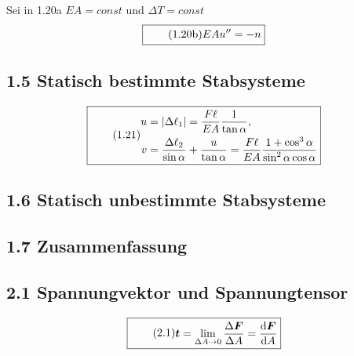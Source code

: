 \documentclass[11pt]{article}
\newcommand{\1}{ {\mathds{1}} }
\newcommand{\abs}[1]{\lvert#1\rvert}
\begin{document}
    Sei in 1.20a $EA = const$ und $\Delta T = const$
    \begin{equation}
      \boxed{
        \tag{1.20b}
        \begin{split}
          EA u''
          =
          -n
        \end{split}
      }
    \end{equation}


    \subsection*{1.5 Statisch bestimmte Stabsysteme}

    \begin{equation}
      \boxed{
        \tag{1.21}
        \begin{split}
          u
          &=
          \abs{\Delta\ell_1}
          =
          \frac{F\ell}{EA}
          \frac{1}{\tan{\alpha}}
          ,\\
          v
          &=
          \frac{\Delta\ell_2}{\sin{\alpha}}
          +
          \frac{u}{\tan{\alpha}}
          =
          \frac{F\ell}{EA}
          \frac{1 + \cos^3\alpha}{\sin^2\alpha \cos \alpha}
        \end{split}
      }
    \end{equation}


    \subsection*{1.6 Statisch unbestimmte Stabsysteme}

    \subsection*{1.7 Zusammenfassung}
    
    \subsection*{2.1 Spannungvektor und Spannungtensor}

    \begin{equation}
      \boxed{
        \tag{2.1}
        \begin{split}
          \boldsymbol{t}
          =
          \lim_{\Delta A \rightarrow 0}
          \frac{\Delta \boldsymbol{F}}{\Delta A}
          =
          \frac{\text{d}\boldsymbol{F}}{\text{d}A}
        \end{split}
      }
    \end{equation}
\end{document}
